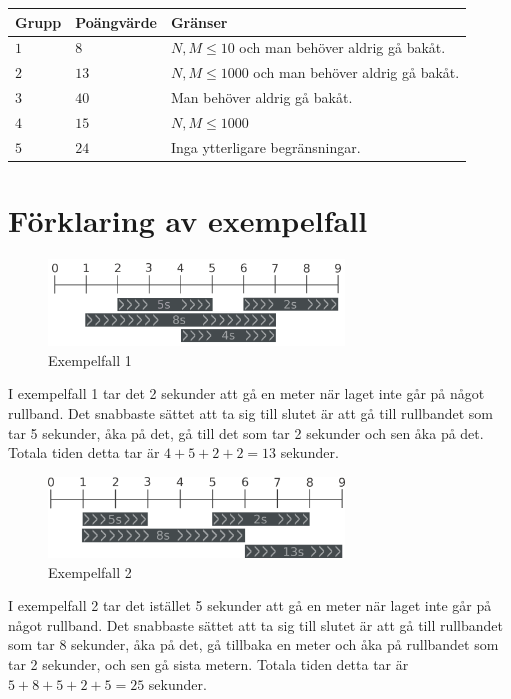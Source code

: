 \noindent
\begin{tabular}{| l | l | p{12cm} |}
  \hline
  Grupp & Poängvärde & Gränser \\ \hline
    $1$   & $8$      & $N,M \le 10$ och man behöver aldrig gå bakåt. \\ \hline
    $2$   & $13$     & $N,M \le 1000$ och man behöver aldrig gå bakåt. \\ \hline
    $3$   & $40$     & Man behöver aldrig gå bakåt. \\ \hline
	$4$   & $15$     & $N,M \le 1000$ \\ \hline
    $5$   & $24$     & Inga ytterligare begränsningar. \\ \hline
\end{tabular}

\section*{Förklaring av exempelfall}

\begin{figure}[h]
	\centering
\includegraphics[width=0.7\textwidth]{sample1}
\caption{Exempelfall 1}
\end{figure}
I exempelfall 1 tar det 2 sekunder att gå en meter när laget inte går på något rullband.
Det snabbaste sättet att ta sig till slutet är att gå till rullbandet som
tar 5 sekunder, åka på det, gå till det som tar 2 sekunder och sen åka på det.
Totala tiden detta tar är $4+5+2+2=13$ sekunder.



\begin{figure}[h]
	\centering
\includegraphics[width=0.7\textwidth]{sample2}
\caption{Exempelfall 2}
\end{figure}
I exempelfall 2 tar det istället 5 sekunder att gå en meter när laget inte går på något rullband.
Det snabbaste sättet att ta sig till slutet är att gå till rullbandet som
tar 8 sekunder, åka på det, gå tillbaka en meter och åka på
rullbandet som tar 2 sekunder, och sen gå sista metern.
Totala tiden detta tar är $5+8+5+2+5=25$ sekunder.
